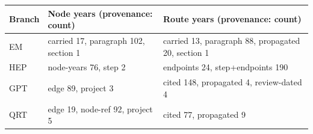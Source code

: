 \begin{tabular}{@{}lp{5.6cm}p{6.2cm}@{}}\toprule
Branch & Node years (provenance: count) & Route years (provenance: count) \\\midrule
EM & carried 17, paragraph 102, section 1 & carried 13, paragraph 88, propagated 20, section 1 \\
HEP & node-years 76, step 2 & endpoints 24, step+endpoints 190 \\
GPT & edge 89, project 3 & cited 148, propagated 4, review-dated 4 \\
QRT & edge 19, node-ref 92, project 5 & cited 77, propagated 9 \\
\bottomrule\end{tabular}
